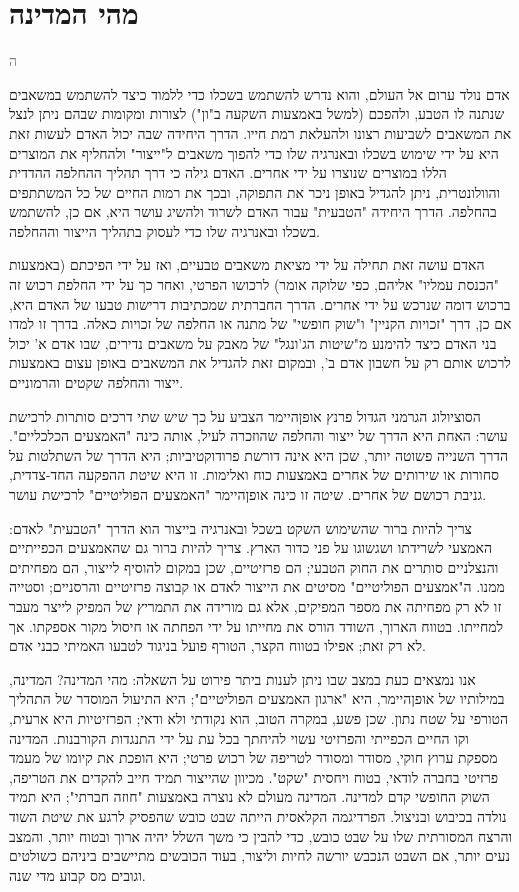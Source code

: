 \documentclass[12pt,oneside]{book}
\newcommand{\hebrewchapter}[2]{%
  \chapter*{#1}%
  \addcontentsline{toc}{chapter}{#1}%
  \lettrine[lines=4, lhang=0.1, loversize=0.5, findent=0pt]{\textcolor{gray} #2}{}%
}
\begin{document}
\hebrewchapter{מהי המדינה}{ה}
אדם נולד ערום אל העולם, והוא נדרש להשתמש בשכלו כדי ללמוד כיצד להשתמש במשאבים שנתנה לו הטבע, ולהפכם (למשל באמצעות השקעה ב"ון") לצורות ומקומות שבהם ניתן לנצל את המשאבים לשביעות רצונו ולהעלאת רמת חייו. הדרך היחידה שבה יכול האדם לעשות זאת היא על ידי שימוש בשכלו ובאנרגיה שלו כדי להפוך משאבים ל"ייצור" ולהחליף את המוצרים הללו במוצרים שנוצרו על ידי אחרים. האדם גילה כי דרך תהליך ההחלפה ההדדית והוולונטרית, ניתן להגדיל באופן ניכר את התפוקה, ובכך את רמות החיים של כל המשתתפים בהחלפה. הדרך היחידה "הטבעית" עבור האדם לשרוד ולהשיג עושר היא, אם כן, להשתמש בשכלו ובאנרגיה שלו כדי לעסוק בתהליך הייצור וההחלפה.

האדם עושה זאת תחילה על ידי מציאת משאבים טבעיים, ואז על ידי הפיכתם (באמצעות "הכנסת עמליו" אליהם, כפי שלוקה אומר) לרכושו הפרטי, ואחר כך על ידי החלפת רכוש זה ברכוש דומה שנרכש על ידי אחרים. הדרך החברתית שמכתיבות דרישות טבעו של האדם היא, אם כן, דרך "זכויות הקניין" ו"שוק חופשי" של מתנה או החלפה של זכויות כאלה. בדרך זו למדו בני האדם כיצד להימנע מ"שיטות הג'ונגל" של מאבק על משאבים נדירים, שבו אדם א' יכול לרכוש אותם רק על חשבון אדם ב', ובמקום זאת להגדיל את המשאבים באופן עצום באמצעות ייצור והחלפה שקטים והרמוניים.

הסוציולוג הגרמני הגדול פרנץ אופןהיימר הצביע על כך שיש שתי דרכים סותרות לרכישת עושר: האחת היא הדרך של ייצור והחלפה שהוזכרה לעיל, אותה כינה "האמצעים הכלכליים". הדרך השנייה פשוטה יותר, שכן היא אינה דורשת פרודוקטיביות; היא הדרך של השתלטות על סחורות או שירותים של אחרים באמצעות כוח ואלימות. זו היא שיטת ההפקעה החד-צדדית, גניבת רכושם של אחרים. שיטה זו כינה אופןהיימר "האמצעים הפוליטיים" לרכישת עושר.

צריך להיות ברור שהשימוש השקט בשכל ובאנרגיה בייצור הוא הדרך "הטבעית" לאדם: האמצעי לשרידתו ושגשוגו על פני כדור הארץ. צריך להיות ברור גם שהאמצעים הכפייתיים והנצלניים סותרים את החוק הטבעי; הם פרזיטיים, שכן במקום להוסיף לייצור, הם מפחיתים ממנו. ה"אמצעים הפוליטיים" מסיטים את הייצור לאדם או קבוצה פרזיטיים והרסניים; וסטייה זו לא רק מפחיתה את מספר המפיקים, אלא גם מורידה את התמריץ של המפיק לייצר מעבר למחייתו. בטווח הארוך, השודד הורס את מחייתו על ידי הפחתה או חיסול מקור אספקתו. אך לא רק זאת; אפילו בטווח הקצר, הטורף פועל בניגוד לטבעו האמיתי כבני אדם.

אנו נמצאים כעת במצב שבו ניתן לענות ביתר פירוט על השאלה: מהי המדינה? המדינה, במילותיו של אופןהיימר, היא "ארגון האמצעים הפוליטיים"; היא התיעול המוסדר של התהליך הטורפי על שטח נתון. שכן פשע, במקרה הטוב, הוא נקודתי ולא ודאי; הפרזיטיות היא ארעית, וקו החיים הכפייתי והפרזיטי עשוי להיחתך בכל עת על ידי התנגדות הקורבנות. המדינה מספקת ערוץ חוקי, מסודר ומסודר לטריפה של רכוש פרטי; היא הופכת את קיומו של מעמד פרזיטי בחברה לודאי, בטוח ויחסית "שקט". מכיוון שהייצור תמיד חייב להקדים את הטריפה, השוק החופשי קדם למדינה. המדינה מעולם לא נוצרה באמצעות "חוזה חברתי"; היא תמיד נולדה בכיבוש ובניצול. הפרדיגמה הקלאסית הייתה שבט כובש שהפסיק לרגע את שיטת השוד והרצח המסורתית שלו על שבט כובש, כדי להבין כי משך השלל יהיה ארוך ובטוח יותר, והמצב נעים יותר, אם השבט הנכבש יורשה לחיות וליצור, בעוד הכובשים מתיישבים ביניהם כשולטים וגובים מס קבוע מדי שנה.
\end{document}
